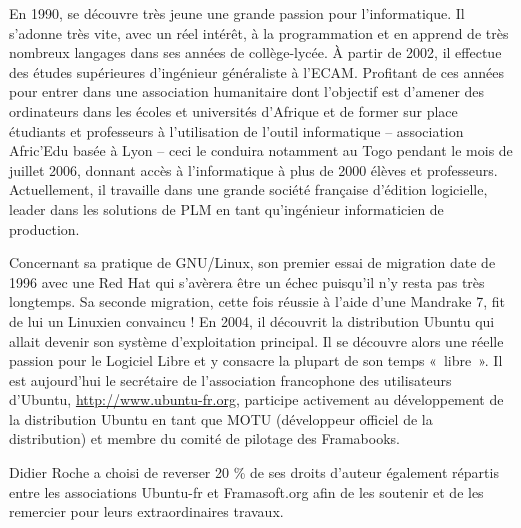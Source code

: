 En 1990,  se découvre très jeune une grande passion pour l'informatique. Il s'adonne très vite, avec un réel intérêt, à la programmation et en apprend de très nombreux langages dans ses années de collège-lycée. À partir de 2002, il effectue des études supérieures d'ingénieur généraliste à l'ECAM. Profitant de ces années pour entrer dans une association humanitaire dont l'objectif est d'amener des ordinateurs dans les écoles et universités d'Afrique et de former sur place étudiants et professeurs à l'utilisation de l'outil informatique -- association Afric'Edu basée à Lyon -- ceci le conduira notamment au Togo pendant le mois de juillet 2006, donnant accès à l'informatique à plus de 2000 élèves et professeurs. Actuellement, il travaille dans une grande société française d'édition logicielle, leader dans les solutions de PLM en tant qu'ingénieur informaticien de production.\par
Concernant sa pratique de GNU/Linux, son premier essai de migration date de 1996 avec une Red Hat qui s'avèrera être un échec puisqu'il n'y resta pas très longtemps. Sa seconde migration, cette fois réussie à l'aide d'une Mandrake 7, fit de lui un Linuxien convaincu ! En 2004, il découvrit la distribution Ubuntu qui allait devenir son système d'exploitation principal. Il se découvre alors une réelle passion pour le Logiciel Libre et y consacre la plupart de son temps «~libre~». Il est aujourd'hui le secrétaire de l'association francophone des utilisateurs d'Ubuntu, \url{http://www.ubuntu-fr.org}, participe activement au développement de la distribution Ubuntu en tant que MOTU (développeur officiel de la distribution) et membre du comité de pilotage des Framabooks.\par
Didier Roche a choisi de reverser 20 \% de ses droits d'auteur également répartis entre les associations Ubuntu-fr et Framasoft.org afin de les soutenir et de les remercier pour leurs extraordinaires travaux.\par
